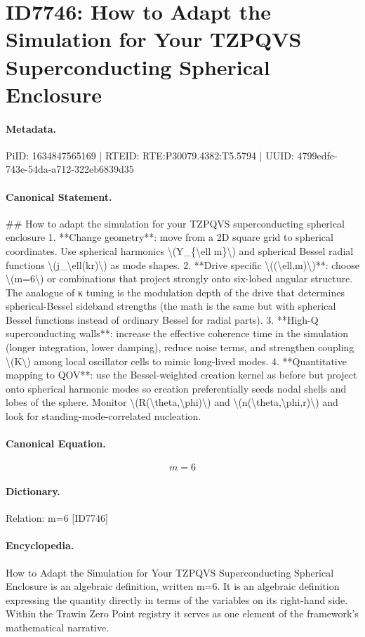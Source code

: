 \section*{ID7746: How to Adapt the Simulation for Your TZPQVS Superconducting Spherical Enclosure}
\paragraph{Metadata.}
PiID: 1634847565169 | RTEID: RTE:P30079.4382:T5.5794 | UUID: 4799edfe-743e-54da-a712-322eb6839d35

\paragraph{Canonical Statement.}
\#\# How to adapt the simulation for your TZPQVS superconducting spherical enclosure 1. **Change geometry**: move from a 2D square grid to spherical coordinates. Use spherical harmonics \textbackslash{}(Y\_\{\textbackslash{}ell m\}\textbackslash{}) and spherical Bessel radial functions \textbackslash{}(j\_\textbackslash{}ell(kr)\textbackslash{}) as mode shapes. 2. **Drive specific \textbackslash{}((\textbackslash{}ell,m)\textbackslash{})**: choose \textbackslash{}(m=6\textbackslash{}) or combinations that project strongly onto six-lobed angular structure. The analogue of κ tuning is the modulation depth of the drive that determines spherical-Bessel sideband strengths (the math is the same but with spherical Bessel functions instead of ordinary Bessel for radial parts). 3. **High-Q superconducting walls**: increase the effective coherence time in the simulation (longer integration, lower damping), reduce noise terms, and strengthen coupling \textbackslash{}(K\textbackslash{}) among local oscillator cells to mimic long-lived modes. 4. **Quantitative mapping to QOV**: use the Bessel-weighted creation kernel as before but project onto spherical harmonic modes so creation preferentially seeds nodal shells and lobes of the sphere. Monitor \textbackslash{}(R(\textbackslash{}theta,\textbackslash{}phi)\textbackslash{}) and \textbackslash{}(n(\textbackslash{}theta,\textbackslash{}phi,r)\textbackslash{}) and look for standing-mode-correlated nucleation.

\paragraph{Canonical Equation.}
\[
m=6
\]

\paragraph{Dictionary.}
Relation: m=6 [ID7746]

\paragraph{Encyclopedia.}
How to Adapt the Simulation for Your TZPQVS Superconducting Spherical Enclosure is an algebraic definition, written m=6. It is an algebraic definition expressing the quantity directly in terms of the variables on its right-hand side. Within the Trawin Zero Point registry it serves as one element of the framework's mathematical narrative.
